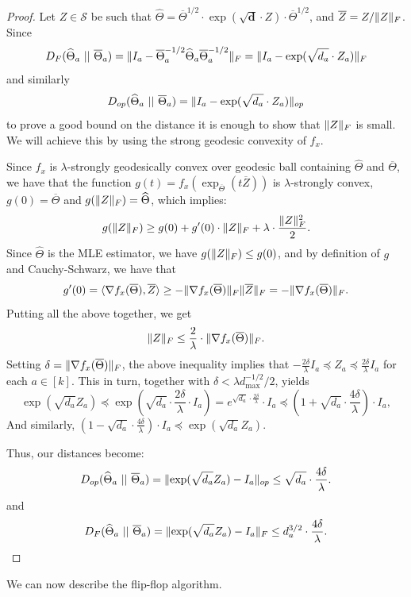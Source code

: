 \documentclass[aos]{imsart}
\theoremstyle{definition}
\numberwithin{equation}{section}
\DeclarePairedDelimiter{\norm}{\lVert}{\rVert}
\newcommand{\otheta}{\overline{\Theta}}
\newcommand{\htheta}{\widehat{\Theta}}
\newcommand{\oZ}{\overline{Z}}
\renewcommand{\vec}{\bm}
\newcommand{\Sym}{\mathcal{S}}
\def\dmax{d_{\max}}
\begin{document}
\begin{proof}
	Let $Z \in \Sym$ be such that $\htheta = \otheta^{1/2} \cdot \exp(\sqrt{\vec d} \cdot Z) \cdot \otheta^{1/2}$, and $\oZ = Z / \norm{Z}_F$.
	Since
	$$ D_F(\htheta_a \ || \ \otheta_a) = \norm{I_a - \otheta_a^{-1/2} \htheta_a \otheta_a^{-1/2}}_F = \norm{I_a - \exp(\sqrt{d_a} \cdot Z_a)}_F $$
	and similarly
	$$ D_{op}(\htheta_a \ || \ \otheta_a) = \norm{I_a - \exp(\sqrt{d_a} \cdot Z_a)}_{op} $$
	to prove a good bound on the distance it is enough to show that $\norm{Z}_F$ is small.
	We will achieve this by using the strong geodesic convexity of $f_x$.

	Since $f_x$ is $\lambda$-strongly geodesically convex over geodesic ball containing $\htheta$ and $\otheta$,	we have that the function $g(t) = f_x(\exp_{\otheta} (t \oZ) )$ is $\lambda$-strongly convex, $g(0) = \otheta$ and $g(\norm{Z}_F) = \htheta$, which implies:
	$$ g(\norm{Z}_F) \geq g(0) + g'(0) \cdot \norm{Z}_F + \lambda \cdot \frac{\norm{Z}_F^2}{2}. $$
	Since $\htheta$ is the MLE estimator, we have $g(\norm{Z}_F) \leq g(0)$, and by definition of
	$g$ and Cauchy-Schwarz, we have that
	$$ g'(0) = \langle \nabla f_x(\otheta), \oZ \rangle \geq - \norm{\nabla f_x(\otheta)}_F \norm{\oZ}_F = - \norm{\nabla f_x(\otheta)}_F. $$
	Putting all the above together, we get
	$$ \norm{Z}_F \leq \frac{2}{\lambda} \cdot \norm{\nabla f_x(\otheta)}_F. $$
	Setting $\delta = \norm{\nabla f_x(\otheta)}_F$, the above inequality implies that $- \frac{2\delta}{\lambda} I_a \preceq Z_a \preceq \frac{2\delta}{\lambda} I_a$ for each $a \in [k]$. This in turn, together with $\delta < \lambda \dmax^{-1/2}/2$, yields
	$$ \exp(\sqrt{d_a} Z_a) \preceq \exp\left(\sqrt{d_a} \cdot \frac{2\delta}{\lambda} \cdot I_a \right) 
	= e^{\sqrt{d_a} \cdot \frac{2\delta}{\lambda}} \cdot I_a 
	\preceq \left(  1 + \sqrt{d_a} \cdot \frac{4\delta}{\lambda} \right) \cdot I_a, $$
	And similarly, $\left(  1 - \sqrt{d_a} \cdot \frac{4\delta}{\lambda} \right) \cdot I_a \preceq \exp(\sqrt{d_a} Z_a)$.	
	
	Thus, our distances become:
	$$ D_{op}(\htheta_a \ || \ \otheta_a) =  \norm{\exp(\sqrt{d_a} Z_a) - I_a}_{op} \leq \sqrt{d_a} \cdot \frac{4\delta}{\lambda}. $$
	and 
	$$ D_F(\htheta_a \ || \ \otheta_a) =  \norm{\exp(\sqrt{d_a} Z_a) - I_a}_F \leq d_a^{3/2} \cdot \frac{4\delta}{\lambda}. $$
\end{proof}


We can now describe the flip-flop algorithm.
\end{document}

